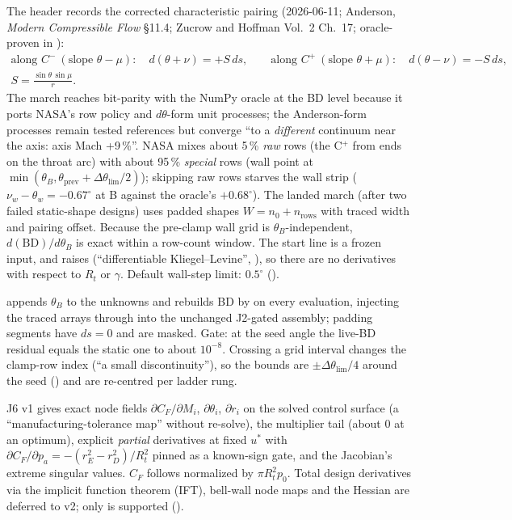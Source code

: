  The header records the corrected characteristic pairing (2026-06-11; Anderson, \emph{Modern Compressible Flow} \S11.4; Zucrow and Hoffman Vol.~2 Ch.~17; oracle-proven in ):
\begin{gather*}
\text{along } C^- \ (\text{slope } \theta-\mu):\quad d(\theta+\nu)=+S\,ds,\qquad
\text{along } C^+ \ (\text{slope } \theta+\mu):\quad d(\theta-\nu)=-S\,ds,\\
S=\frac{\sin\theta\,\sin\mu}{r}.
\end{gather*}
The march reaches bit-parity with the NumPy oracle  at the BD level because it ports NASA's row policy and $d\theta$-form unit processes; the Anderson-form processes remain tested references but converge ``to a \emph{different} continuum near the axis: axis Mach +9\,\%''. NASA mixes about 5\,\% \emph{raw} rows (the C$^+$ from  ends on the throat arc) with about 95\,\% \emph{special} rows (wall point at $\min(\theta_B,\theta_{\text{prev}}+\Delta\theta_{\lim}/2)$); skipping raw rows starves the wall strip ($\nu_w-\theta_w=-0.67^\circ$ at B against the oracle's $+0.68^\circ$). The landed march (after two failed static-shape designs) uses padded shapes $W=n_0+n_{\text{rows}}$ with traced width and pairing offset. Because the pre-clamp wall grid is $\theta_B$-independent, $d(\text{BD})/d\theta_B$ is exact within a row-count window. The start line is a frozen input, and  raises  (``differentiable Kliegel--Levine'', ), so there are no derivatives with respect to $R_t$ or $\gamma$. Default wall-step limit: $0.5^\circ$ ().

  appends $\theta_B$ to the unknowns and rebuilds BD by  on every evaluation, injecting the traced arrays through  into the unchanged J2-gated assembly; padding segments have $ds=0$ and are masked. Gate: at the seed angle the live-BD residual equals the static one to about $10^{-8}$. Crossing a grid interval changes the clamp-row index (``a small discontinuity''), so the bounds are $\pm\Delta\theta_{\lim}/4$ around the seed () and are re-centred per ladder rung.

 J6 v1 gives exact node fields $\partial C_F/\partial M_i$, $\partial\theta_i$, $\partial r_i$ on the solved control surface (a ``manufacturing-tolerance map'' without re-solve), the multiplier tail (about 0 at an optimum), explicit \emph{partial} derivatives at fixed $u^*$ with $\partial C_F/\partial p_a=-(r_E^2-r_D^2)/R_t^2$ pinned as a known-sign gate, and the Jacobian's extreme singular values. $C_F$ follows  normalized by $\pi R_t^2p_0$. Total design derivatives via the implicit function theorem (IFT), bell-wall node maps and the Hessian are deferred to v2; only  is supported ().


